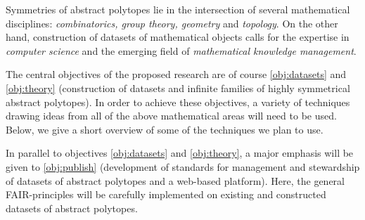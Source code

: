 %
%


Symmetries of abstract polytopes lie in the intersection of several mathematical disciplines: {\em combinatorics, group theory, geometry} and {\em topology}. On the other hand, construction of datasets of mathematical objects calls for the expertise in {\em computer science} and the emerging field of {\em mathematical knowledge management}.

The central objectives of the proposed research are of course \cref{obj:datasets} and \cref{obj:theory} (construction of datasets and infinite families of highly symmetrical abstract polytopes). In order to achieve these objectives, a variety of techniques drawing ideas from all of the above  mathematical areas will need to be used. Below, we give a short overview of some of the techniques we plan to use.

In parallel to objectives \cref{obj:datasets} and \cref{obj:theory}, a major emphasis will be given to \cref{obj:publish}
(development of standards for management and stewardship of datasets of abstract polytopes and a web-based platform).
Here, the general FAIR-principles will be carefully implemented on existing and constructed datasets of abstract polytopes.

